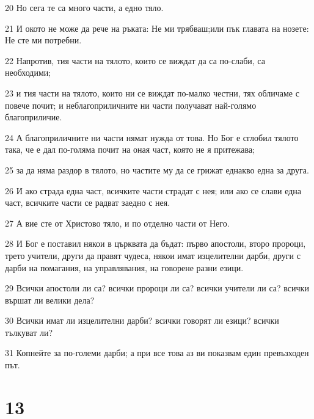 \par 20 Но сега те са много части, а едно тяло.
\par 21 И окото не може да рече на ръката: Не ми трябваш;или пък главата на нозете: Не сте ми потребни.
\par 22 Напротив, тия части на тялото, които се виждат да са по-слаби, са необходими;
\par 23 и тия части на тялото, които ни се виждат по-малко честни, тях обличаме с повече почит; и неблагоприличните ни части получават най-голямо благоприличие.
\par 24 А благоприличните ни части нямат нужда от това. Но Бог е сглобил тялото така, че е дал по-голяма почит на оная част, която не я притежава;
\par 25 за да няма раздор в тялото, но частите му да се грижат еднакво една за друга.
\par 26 И ако страда една част, всичките части страдат с нея; или ако се слави една част, всичките части се радват заедно с нея.
\par 27 А вие сте от Христово тяло, и по отделно части от Него.
\par 28 И Бог е поставил някои в църквата да бъдат: първо апостоли, второ пророци, трето учители, други да правят чудеса, някои имат изцелителни дарби, други с дарби на помагания, на управлявания, на говорене разни езици.
\par 29 Всички апостоли ли са? всички пророци ли са? всички учители ли са? всички вършат ли велики дела?
\par 30 Всички имат ли изцелителни дарби? всички говорят ли езици? всички тълкуват ли?
\par 31 Копнейте за по-големи дарби; а при все това аз ви показвам един превъзходен път.

\chapter{13}

